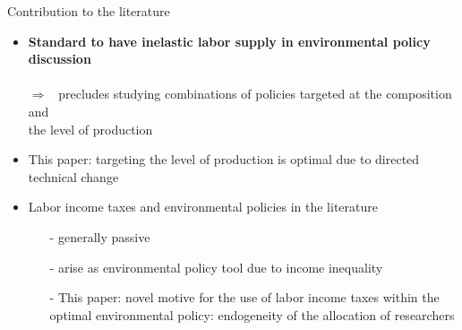 \documentclass[11pt,aspectratio=169]{beamer}
\newcommand{\ar}{$\Rightarrow$ \ }
\begin{document}
\begin{frame}{Contribution to the literature}
	\begin{itemize}[<+->]
		\item \alert{\textbf{Standard to have inelastic labor supply in environmental policy discussion}}\\  \footnotesize{ \citep{Acemoglu2012TheChange, Golosov2014OptimalEquilibrium, Acemoglu2016TransitionTechnology, Fried2018ClimateAnalysis, Hart2019TheEconomists}}
		\\  \normalsize{\alert{\ar precludes studying combinations of policies targeted at the composition and\\ \hspace{5mm} the level of production }}
		\vspace{2mm}
		\item \alert{This paper}: targeting the level of production is optimal due to  directed technical change %
		\footnotesize{\citep{Acemoglu2012TheChange}}
		\vspace{2mm}
		\item \alert{Labor income taxes and environmental policies in the literature}
		\begin{itemize}
			\item[-]  generally passive \footnotesize{ \citep{ LansBovenberg1994EnvironmentalTaxation, Goulder1995EnvironmentalGuide, Barrage2019OptimalPolicy}} %
			\item[-] arise as environmental policy tool due to {income inequality} \footnotesize{\citep{Jacobs2019RedistributionCurves, Dobkowitz2022, Douenne2022OptimalHouseholds}}
			\item[-] This paper: novel motive for the use of labor income taxes within the optimal environmental policy: endogeneity of the allocation of researchers
		\end{itemize}

\end{itemize}
\end{frame}
\end{document}
